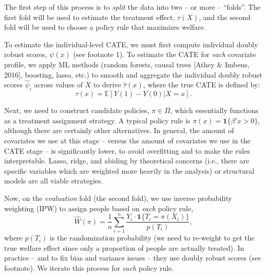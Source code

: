 \documentclass[12pt,letterpaper,doublespace, oneside]{article}
\begin{document}
The first step of this process is to \emph{split} the data into two -- or more -- \enquote{folds}. The first fold will be used to estimate the treatment effect, $\tau(X)$, and the second fold will be used to choose a policy rule that maximizes welfare. 

To estimate the individual-level CATE, we must first compute individual doubly robust scores, $\psi(x)$ (see footnote 1). To estimate the CATE for \emph{each} covariate profile, we apply ML methods (random forests, causal trees [Athey \& Imbens, 2016], boosting, lasso, etc.) to smooth and aggregate the individual doubly robust scores $\hat{\psi}_i$ across values of $X$ to derive $\hat{\tau}(x)$, where the true CATE is defined by:
\[
\tau(x) = \mathbb{E}[Y(1) - Y(0)|X=x]. 
\]

Next, we need to construct candidate policies, $\pi \in \Pi$, which essentially functions as a treatment assignment strategy. A typical policy rule is $\pi(x) = \mathbf{1}\{\beta'x > 0\}$, although there are certainly other alternatives. In general, the amount of covariates we use at this stage -- versus the amount of covariates we use in the CATE stage -- is significantly lower, to avoid overfitting and to make the rules interpretable. Lasso, ridge, and abiding by theoretical concerns (i.e., there are specific variables which are weighted more heavily in the analysis) or structural models are all viable strategies. 

Now, on the \emph{evaluation} fold (the second fold), we use inverse probability weighting (IPW) to assign people based on \emph{each} policy rule,
\[
\hat{W}(\pi) = \frac{1}{n}\sum_{i=1}^n\frac{Y_i\cdot \mathbf{1}\{T_i = \pi(X_i)\}}{p(T_i)}, 
\]
where $p(T_i)$ is the randomization probability (we need to re-weight to get the true welfare effect since only a proportion of people are actually treated). In practice -- and to fix bias and variance issues -- they use doubly robust scores (see footnote). We iterate this process for \emph{each} policy rule. 
\end{document}
